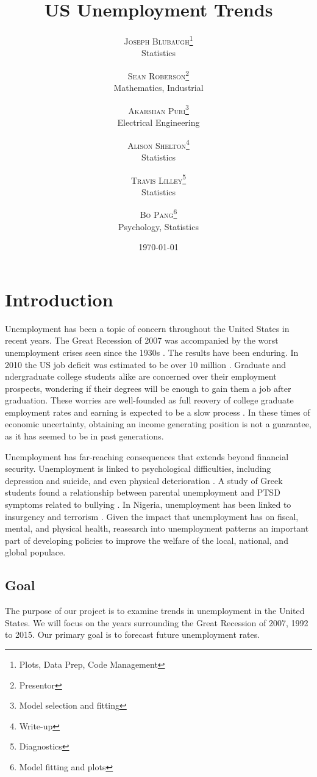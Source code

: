\documentclass[twoside,twocolumn]{article}
\title{US Unemployment Trends} %
\author{%
\textsc{Joseph Blubaugh}\thanks{Plots, Data Prep, Code Management} \\[1ex] %
\normalsize Statistics\\ %
\and %
\textsc{Sean Roberson}\thanks{Presentor} \\[1ex] %
\normalsize Mathematics, Industrial\\ %
\and 
\textsc{Akarshan Puri}\thanks{Model selection and fitting} \\[1ex] 
\normalsize Electrical Engineering\\ 
\and 
\textsc{Alison Shelton}\thanks{Write-up} \\[1ex] 
\normalsize Statistics\\ 
\and 
\textsc{Travis Lilley}\thanks{Diagnostics} \\[1ex] 
\normalsize Statistics\\ 
\and
\textsc{Bo Pang}\thanks{Model fitting and plots} \\[1 ex]
\normalsize Psychology, Statistics
\vspace*{.5 cm}
}
\date{\today \vspace*{.25 cm}} %
\begin{document}
\maketitle



\section{Introduction}
		Unemployment has been a topic of concern throughout the United States in recent years.  The Great Recession of 2007 was accompanied by the worst unemployment crises seen since the 1930s \citep{wanberg2012individual}.   The results have been enduring. In 2010 the US job deficit was estimated to be over 10 million \citep{katz2010}. Graduate and ndergraduate college students alike are concerned over their employment prospects, wondering if their degrees will be enough to gain them a job after graduation.  These worries are well-founded as full reovery of college graduate employment rates and earning is expected to be a slow process \citep{carnevale2015hard}.  In these times of economic uncertainty, obtaining an income generating position is not a guarantee, as it has seemed to be in past generations.
		
Unemployment has far-reaching consequences that extends beyond financial security. Unemployment is linked to psychological difficulties, including depression and suicide, and even physical deterioration \citep{wanberg2012individual, insecure, suicide}. A study of Greek students found a relationship between parental unemployment and PTSD symptoms related to bullying \citep{kanellopoulos2014epa}. In Nigeria, unemployment has been linked to insurgency and terrorism \citep{terrorism}. Given the impact that unemployment has on fiscal, mental, and physical health, reasearch into unemployment patterns an important part of developing policies to improve the welfare of the local, national, and global populace.

\subsection{Goal}
		The purpose of our project is to examine trends in unemployment in the United States. We will focus on the years surrounding the Great Recession of 2007, 1992 to 2015.  Our primary goal is to forecast future unemployment rates. 
\end{document}
